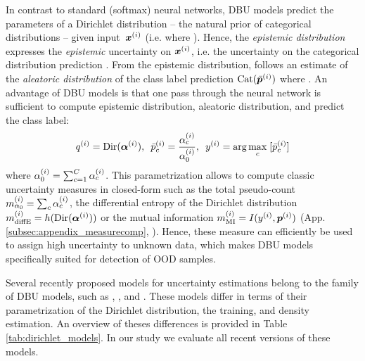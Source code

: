 In contrast to standard (softmax) neural networks, DBU models predict the parameters of a Dirichlet distribution -- the natural prior of categorical distributions -- given input~${\bm{x}} ^{(i)}$ (i.e.  where ). Hence, the \emph{epistemic distribution}  expresses the \emph{epistemic} uncertainty on ${\bm{x}} ^{(i)}$, i.e. the uncertainty on the categorical distribution prediction \smash{$\vp\dataix$}. From the epistemic distribution, follows an estimate of the \emph{aleatoric distribution} of the class label prediction $\text{Cat}(\bar{{\bm{p}}}^{(i)})$ where .
An advantage of DBU models is that one pass through the neural network is sufficient to compute epistemic distribution, aleatoric distribution, and predict the class label:
%
\begin{equation}
\begin{aligned}
    q^{(i)}           = \text{Dir}(\bm{\alpha}^{(i)}), \hspace{5pt}
    \bar{p}_c^{(i)}  = \frac{\alpha_c^{(i)}}{\alpha_0^{(i)}}, \hspace{5pt}
    y^{(i)}           = \arg \max_{c} \;[\bar{p}_c^{(i)}]
\end{aligned}
\end{equation}
%
where $\alpha_0^{(i)} = \sum^{C}_{c=1} \alpha_c^{(i)}$. This parametrization allows to compute classic uncertainty measures in closed-form such as the total pseudo-count $m^{(i)}_{\alpha_0} = \sum_c \alpha^{(i)}_c$, the differential entropy of the Dirichlet distribution $m^{(i)}_\text{diffE} = h(\text{Dir}(\bm{\alpha}^{(i)}))$ or the mutual information $m^{(i)}_\text{MI} = I(y^{(i)}, {\bm{p}}^{(i)})$ (App. \ref{subsec:appendix_measurecomp}, \citep{malini2018}). 
Hence, these measure can efficiently be used to assign high uncertainty to unknown data, which makes DBU models specifically suited for detection of OOD samples. 





Several recently proposed models for uncertainty estimations belong to the family of DBU models, such as \PriorNet, \EvNet, \DDNet and \PostNet. These models differ in terms of their parametrization of the Dirichlet distribution, the training, and density estimation. An overview of theses differences is provided in Table \ref{tab:dirichlet_models}. In our study we evaluate all recent versions of these models.


